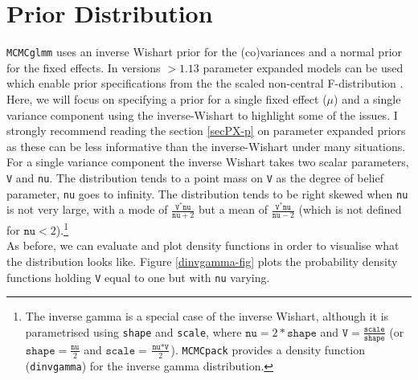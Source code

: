 \documentclass{article}
\begin{document}
\newpage
\section{Prior Distribution}

\texttt{MCMCglmm} uses an inverse Wishart prior for the (co)variances and a normal prior for the fixed effects. In versions $>1.13$ parameter expanded models can be used which enable prior specifications from the the scaled non-central F-distribution \citep{Gelman.2006}. Here, we will focus on specifying a prior for a single fixed effect ($\mu$) and a single variance component using the inverse-Wishart to highlight some of the issues. I strongly recommend reading the section \ref{secPX-p} on parameter expanded priors as these can be less informative than the inverse-Wishart under many situations.\\

For a single variance component the inverse Wishart takes two scalar parameters, \texttt{V} and \texttt{nu}. The distribution tends to a point mass on \texttt{V} as the degree of belief parameter, \texttt{nu} goes to infinity. The distribution tends to be right skewed when \texttt{nu} is not very large, with a mode of $\frac{\texttt{V}^{\ast}\texttt{nu}}{\texttt{nu}+2}$ but a mean of $\frac{\texttt{V}^{\ast}\texttt{nu}}{\texttt{nu}-2}$ (which is not defined for $\texttt{nu}<2$).\footnote{The inverse gamma is a special case of the inverse Wishart, although it is parametrised using \texttt{shape} and \texttt{scale}, where $\texttt{nu}=2\ast\texttt{shape}$ and $\texttt{V} = \frac{\texttt{scale}}{\texttt{shape}}$ (or $\texttt{shape} = \frac{\texttt{nu}}{2}$ and $\texttt{scale} = \frac{\texttt{nu}*\texttt{V}}{2}$). \texttt{MCMCpack} provides a density function (\texttt{dinvgamma}) for the inverse gamma distribution.}\\

As before, we can evaluate and plot density functions in order to visualise what the distribution looks like. Figure \ref{dinvgamma-fig} plots the probability density functions holding \texttt{V} equal to one but with \texttt{nu} varying.\\

\iftalk
\else
\fi

\iftalk
\else
\fi
\end{document}
